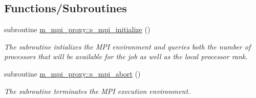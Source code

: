 \subsection*{Functions/\+Subroutines}
\begin{DoxyCompactItemize}
\item 
subroutine \hyperlink{namespacem__mpi__proxy_a9bc4c617505152d3cc553e5bc25c1ee1}{m\+\_\+mpi\+\_\+proxy\+::s\+\_\+mpi\+\_\+initialize} ()
\begin{DoxyCompactList}\small\item\em The subroutine intializes the M\+PI environment and queries both the number of processors that will be available for the job as well as the local processor rank. \end{DoxyCompactList}\item 
subroutine \hyperlink{namespacem__mpi__proxy_a04ac565bad2b22dc045a5eeb4f516e2e}{m\+\_\+mpi\+\_\+proxy\+::s\+\_\+mpi\+\_\+abort} ()
\begin{DoxyCompactList}\small\item\em The subroutine terminates the M\+PI execution environment. \end{DoxyCompactList}\end{DoxyCompactItemize}
